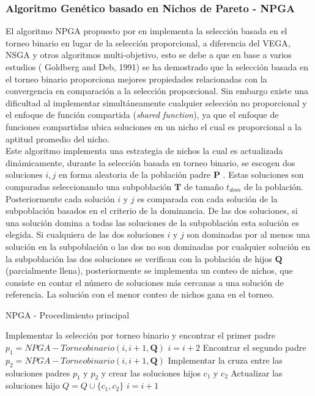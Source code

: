 \subsubsection{Algoritmo Genético basado en Nichos de Pareto - NPGA}
El algoritmo NPGA propuesto por \citeauthor{Joel:NPGA} en \citeyear{Joel:NPGA} implementa la selección basada en el torneo binario en lugar de la selección proporcional, a diferencia del VEGA, NSGA y otros algoritmos multi-objetivo, esto se debe a que en base a varios estudios ( Goldberg and Deb, 1991) se ha demostrado que la selección basada en el torneo binario proporciona mejores propiedades relacionadas con la convergencia en comparación a la selección proporcional.
%
Sin embargo existe una dificultad al implementar simultáneamente cualquier selección no proporcional  y el enfoque de función compartida (\textit{shared function}), ya que el enfoque de funciones compartidas ubica soluciones en un nicho el cual es proporcional a la aptitud promedio del nicho.\\
%
Este algoritmo implementa una estrategia de nichos la cual es actualizada dinámicamente,  durante la selección basada en torneo binario, se escogen dos soluciones $i,j$ en forma aleatoria de la población padre $\mathbf{P}$ .
%
Estas soluciones son comparadas seleccionando una subpoblación $\mathbf{T}$ de tamaño $t_{dom}$ de la población. Posteriormente cada solución $i$ y $ j$ es comparada con cada solución de la subpoblación basados en el criterio de la dominancia.
%
De las dos soluciones, si una solución domina a todas las soluciones de la subpoblación esta solución es elegida.
%
Si cualquiera de las dos soluciones $i$ y $j$ son dominadas por al menos una solución en la subpoblación o las dos no son dominadas por cualquier solución en la subpoblación las dos soluciones se verifican con la población de hijos $\mathbf{Q}$ (parcialmente llena), posteriormente se implementa un conteo de nichos, que consiste en contar el número de soluciones más cercanas a una solución de referencia.
%
La solución con el menor conteo de nichos gana en el torneo.

\begin{algorithm}[H]
  \scriptsize
	\caption{NPGA - Procedimiento principal} 
	\begin{algorithmic}[1]
    \STATE Implementar la selección por torneo binario y encontrar el primer padre $p_1 = NPGA -Torneo binario(i, i+1, \mathbf{Q})$
    \STATE $i=i+2$ 
    \STATE Encontrar el segundo padre $p_2 = NPGA -Torneo binario(i, i+1, \mathbf{Q})$
    \STATE Implementar la cruza entre las soluciones padres $p_1$ y $p_2$ y crear las soluciones hijos $c_1$ y $c_2$ 
    \STATE Actualizar las soluciones hijo $Q = Q \cup \{ c_1, c_2 \}$
    \STATE $i=i+1$ 
    \ENDWHILE
    \end{algorithmic}
    \label{alg1}
\end{algorithm}

